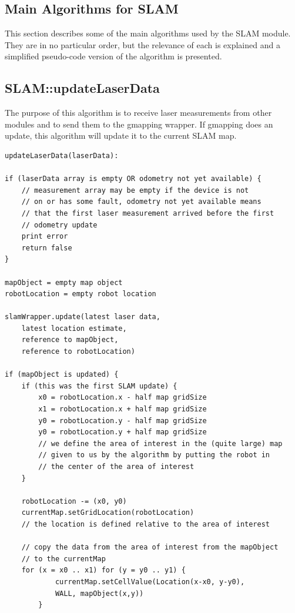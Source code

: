 \documentclass[a4paper,10pt]{article}
\begin{document}
\begin{appendices}
\newpage
\section{Main Algorithms for SLAM}
\label{apA}

This section describes some of the main algorithms used by the SLAM module. They are in no particular order, but the relevance of each is explained and a simplified pseudo-code version of the algorithm is presented.

\subsection{SLAM::updateLaserData}

The purpose of this algorithm is to receive laser measurements from other modules and to send them to the gmapping wrapper. If gmapping does an update, this algorithm will update it to the current SLAM map.

\begin{verbatim}
updateLaserData(laserData):

if (laserData array is empty OR odometry not yet available) {
    // measurement array may be empty if the device is not
    // on or has some fault, odometry not yet available means
    // that the first laser measurement arrived before the first
    // odometry update
    print error
    return false
}

mapObject = empty map object
robotLocation = empty robot location

slamWrapper.update(latest laser data,
	latest location estimate,
	reference to mapObject,
	reference to robotLocation)

if (mapObject is updated) {
    if (this was the first SLAM update) {
        x0 = robotLocation.x - half map gridSize
        x1 = robotLocation.x + half map gridSize
        y0 = robotLocation.y - half map gridSize
        y0 = robotLocation.y + half map gridSize
        // we define the area of interest in the (quite large) map
        // given to us by the algorithm by putting the robot in
        // the center of the area of interest
    }
    
    robotLocation -= (x0, y0)
    currentMap.setGridLocation(robotLocation)
    // the location is defined relative to the area of interest
    
    // copy the data from the area of interest from the mapObject
    // to the currentMap
    for (x = x0 .. x1) for (y = y0 .. y1) {
    		currentMap.setCellValue(Location(x-x0, y-y0),
    		WALL, mapObject(x,y))
    	}
    	

\end{verbatim}
\end{appendices}
\end{document}

